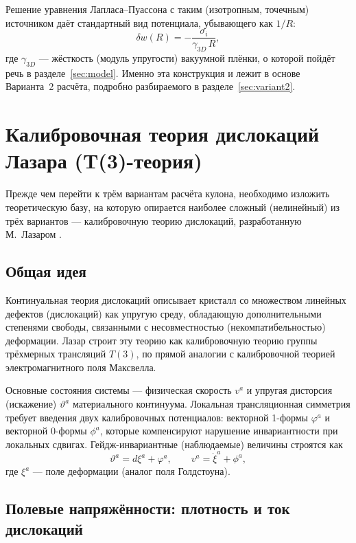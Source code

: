 \documentclass[12pt,a4paper]{article}
\begin{document}
Решение уравнения Лапласа--Пуассона с таким (изотропным, точечным)
источником даёт стандартный вид потенциала, убывающего как $1/R$:
\begin{equation}
\delta w(R) = -\frac{\sigma_i}{\gamma_{3D}\,R},
\end{equation}
где $\gamma_{3D}$ --- жёсткость (модуль упругости) вакуумной плёнки, о
которой пойдёт речь в разделе~\ref{sec:model}. Именно эта конструкция
и лежит в основе Варианта~2 расчёта, подробно разбираемого в
разделе~\ref{sec:variant2}.

\section{Калибровочная теория дислокаций Лазара (T(3)-теория)}
\label{sec:lazar}

Прежде чем перейти к трём вариантам расчёта кулона, необходимо
изложить теоретическую базу, на которую опирается наиболее сложный
(нелинейный) из трёх вариантов --- калибровочную теорию дислокаций,
разработанную М.~Лазаром \cite{Lazar2010}.

\subsection{Общая идея}

Континуальная теория дислокаций описывает кристалл со множеством
линейных дефектов (дислокаций) как упругую среду, обладающую
дополнительными степенями свободы, связанными с несовместностью
(некомпатибельностью) деформации. Лазар строит эту теорию как
калибровочную теорию группы трёхмерных трансляций $T(3)$, по прямой
аналогии с калибровочной теорией электромагнитного поля Максвелла.

Основные состояния системы --- физическая скорость $v^a$ и упругая
дисторсия (искажение) $\vartheta^a$ материального континуума. Локальная
трансляционная симметрия требует введения двух калибровочных
потенциалов: векторной 1-формы $\varphi^a$ и векторной 0-формы $\phi^a$,
которые компенсируют нарушение инвариантности при локальных сдвигах.
Гейдж-инвариантные (наблюдаемые) величины строятся как
\begin{equation}
\vartheta^a = d\xi^a+\varphi^a,\qquad v^a=\dot\xi^a+\phi^a,
\end{equation}
где $\xi^a$ --- поле деформации (аналог поля Голдстоуна).

\subsection{Полевые напряжённости: плотность и ток дислокаций}
\end{document}
